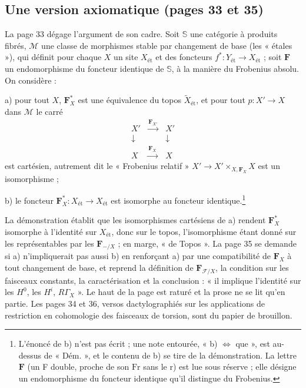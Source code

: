 \documentclass[11pt,a4paper]{article}
\begin{document}
\subsection*{Une version axiomatique (pages 33 et 35)}

La page 33 dégage l'argument de son cadre. Soit $\mathbb{S}$ une catégorie à
produits fibrés, $\mathcal{M}$ une classe de morphismes stable par changement
de base (les « étales »), qui définit pour chaque $X$ un site $X_{\text{ét}}$
et des foncteurs $f^{*} : Y_{\text{ét}} \to X_{\text{ét}}$ ; soit $\mathbf{F}$
un endomorphisme du foncteur identique de $\mathbb{S}$, à la manière du
Frobenius absolu. On considère :

a) pour tout $X$, $\mathbf{F}_X^{*}$ est une équivalence du topos
$\widetilde{X}_{\text{ét}}$, et pour tout $p : X' \to X$ dans $\mathcal{M}$ le
carré
\[
\begin{array}{ccc}
X' & \xrightarrow{\ \mathbf{F}_{X'}\ } & X' \\
\downarrow & & \downarrow \\
X & \xrightarrow{\ \mathbf{F}_{X}\ } & X
\end{array}
\]
est cartésien, autrement dit le « Frobenius relatif » $X' \to X' \times_{X,
\mathbf{F}_X} X$ est un isomorphisme ;

b) le foncteur $\mathbf{F}_X^{*} : X_{\text{ét}} \to X_{\text{ét}}$ est
isomorphe au foncteur identique.\footnote{L'énoncé de b) n'est pas écrit ; une
note entourée, « b) $\Leftrightarrow$ que », est au-dessus de « Dém. », et le
contenu de b) se tire de la démonstration. La lettre $\mathbf{F}$ (un F
double, proche de son $\mathrm{Fr}$ sans le r) est lue sous réserve ; elle
désigne un endomorphisme du foncteur identique qu'il distingue du
Frobenius.}

La démonstration établit que les isomorphismes cartésiens de a) rendent
$\mathbf{F}_X^{*}$ isomorphe à l'identité sur $X_{\text{ét}}$, donc sur le
topos, l'isomorphisme étant donné sur les représentables par les
$\mathbf{F}_{-/X}$ ; en marge, « de Topos ». La page 35 se demande si a)
n'impliquerait pas aussi b) en renforçant a) par une compatibilité de
$\mathbf{F}_X$ à tout changement de base, et reprend la définition de
$\mathbf{F}_{\mathcal{F}/X}$, la condition sur les faisceaux constants, la
caractérisation et la conclusion : « il implique l'identité sur les $H^0$, les
$H^{i}$, $R\Gamma_X$ ». Le haut de la page est raturé et la prose ne se lit
qu'en partie. Les pages 34 et 36, versos dactylographiés sur les applications
de restriction en cohomologie des faisceaux de torsion, sont du papier de
brouillon.
\end{document}
